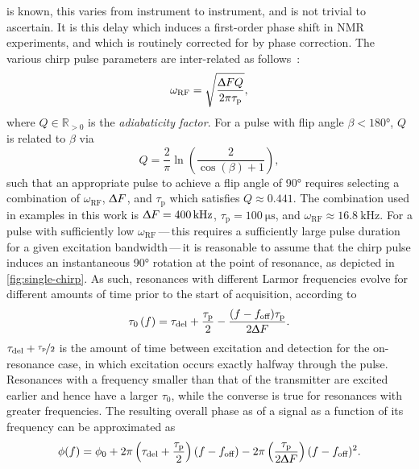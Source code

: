 is known, this varies from instrument to instrument, and is not trivial to
ascertain. It is this delay which induces a first-order phase shift in \ac{NMR}
experiments, and which is routinely corrected for by phase correction.
The various chirp pulse parameters are inter-related as
follows~\cite{Foroozandeh2019,Kupce1995b}:
\begin{equation}
    \omega_{\text{RF}} = \sqrt{
        \frac{\Updelta F Q}{2 \pi \tau_{\text{p}}}
    },
\end{equation}
where $Q \in \mathbb{R}_{>0}$ is the \emph{adiabaticity factor}.
For a pulse with flip angle  $\beta < \ang{180}$, $Q$ is related to $\beta$ via
\begin{equation}
    Q = \frac{2}{\pi} \ln \left( \frac{2}{\cos(\beta) + 1} \right),
\end{equation}
such that an appropriate pulse to achieve a flip angle of \ang{90} requires
selecting a combination of $\omega_{\text{RF}}$, $\Updelta F$, and
$\tau_{\text{p}}$ which satisfies $Q \approx 0.441$.
The combination used in examples in this work is $\Updelta F =
\qty{400}{\kilo\hertz}$, $\tau_{\text{p}} = \qty{100}{\micro\second}$, and
$\omega_{\text{RF}} \approx \qty{16.8}{\kilo\hertz}$.
For a pulse with sufficiently low $\omega_{\text{RF}}$\,---\,this requires a
sufficiently large pulse duration for a given excitation bandwidth\,---\,it is
reasonable to assume that the chirp pulse induces an instantaneous \ang{90}
rotation at the point of resonance, as depicted in
\cref{fig:single-chirp}. As such, resonances with different
Larmor frequencies evolve for different amounts of time prior to the start of
acquisition, according to
\begin{equation}
    \tau_0\left(f\right) =
        \tau_{\text{del}} + \frac{\tau_{\text{p}}}{2} -
        \frac{(f - f_{\text{off}}) \tau_{\text{p}}}{2 \Updelta F}.
    \label{eq:t0}
\end{equation}
$\tau_{\text{del}} + \nicefrac{\tau_{\text{p}}}{2}$ is the amount of time
between excitation and detection for the on-resonance case, in which
excitation occurs exactly halfway through the pulse. Resonances
with a frequency smaller than that of the transmitter are excited earlier and hence
have a larger $\tau_0$, while the converse is true for resonances with greater
frequencies. The resulting overall phase as of a signal as a function of its
frequency can be approximated as~\cite{Foroozandeh2019}
\begin{equation}
    \phi(f) = \phi_0 + 2 \pi \left(\tau_{\text{del}} + \frac{\tau_{\text{p}}}{2} \right) (f - f_{\text{off}}) -
        2 \pi \left(\frac{\tau_{\text{p}}}{2 \Updelta F}\right)
        (f - f_{\text{off}})^2.
    \label{eq:quadratic-phase}
\end{equation}
